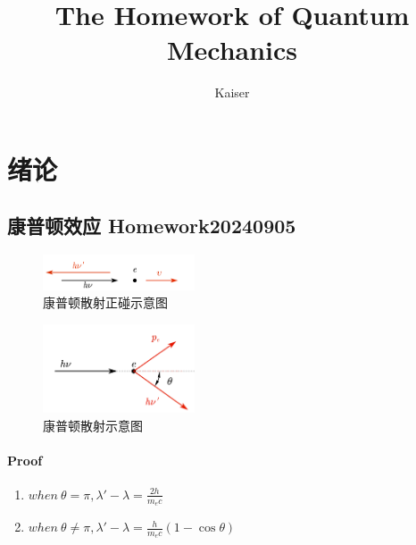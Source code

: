 \documentclass{article}
\title{The Homework of Quantum Mechanics}
\author{Kaiser}
\begin{document}
\maketitle

\tableofcontents

\newpage


\section{绪论}

\subsection{康普顿效应 Homework20240905}
\begin{figure}[!h]
    \centering
    \includegraphics[width = 0.4\textwidth]{figure/康普顿散射正碰.png}
    \caption{康普顿散射正碰示意图}
\end{figure}
\begin{figure}[!h]
    \centering
    \includegraphics[width = 0.4\textwidth]{figure/康普顿散射示意图.png}
    \caption{康普顿散射示意图}
\end{figure}
\paragraph{Proof}
\begin{enumerate}
    \item $\displaystyle{when\  \theta = \pi,\lambda'-\lambda = \frac{2h}{m_ec}}$
    \item $\displaystyle{when\  \theta \neq \pi,\lambda'-\lambda = \frac{h}{m_ec}(1-\cos\theta)}$
\end{enumerate}
\end{document}
